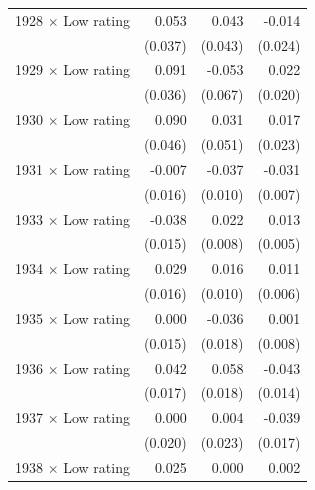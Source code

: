 \begin{longtable}{l*{3}{D{.}{.}{-1}}}
    1928 \ensuremath{\times} Low rating&       0.053         &       0.043         &      -0.014         \\
                        &     (0.037)         &     (0.043)         &     (0.024)         \\
    1929 \ensuremath{\times} Low rating&       0.091\sym{**} &      -0.053         &       0.022         \\
                        &     (0.036)         &     (0.067)         &     (0.020)         \\
    1930 \ensuremath{\times} Low rating&       0.090\sym{*}  &       0.031         &       0.017         \\
                        &     (0.046)         &     (0.051)         &     (0.023)         \\
    1931 \ensuremath{\times} Low rating&      -0.007         &      -0.037\sym{***}&      -0.031\sym{***}\\
                        &     (0.016)         &     (0.010)         &     (0.007)         \\
    1933 \ensuremath{\times} Low rating&      -0.038\sym{**} &       0.022\sym{**} &       0.013\sym{**} \\
                        &     (0.015)         &     (0.008)         &     (0.005)         \\
    1934 \ensuremath{\times} Low rating&       0.029\sym{*}  &       0.016         &       0.011\sym{*}  \\
                        &     (0.016)         &     (0.010)         &     (0.006)         \\
    1935 \ensuremath{\times} Low rating&       0.000         &      -0.036\sym{*}  &       0.001         \\
                        &     (0.015)         &     (0.018)         &     (0.008)         \\
    1936 \ensuremath{\times} Low rating&       0.042\sym{**} &       0.058\sym{***}&      -0.043\sym{***}\\
                        &     (0.017)         &     (0.018)         &     (0.014)         \\
    1937 \ensuremath{\times} Low rating&       0.000         &       0.004         &      -0.039\sym{**} \\
                        &     (0.020)         &     (0.023)         &     (0.017)         \\
    1938 \ensuremath{\times} Low rating&       0.025         &       0.000         &       0.002         \\

\end{longtable}
